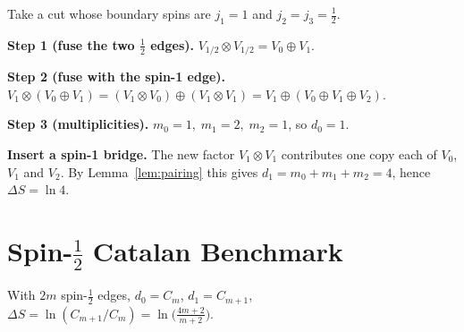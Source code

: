 \documentclass[11pt]{article}
\begin{document}
\begin{example}\label{ex:mixed}
  Take a cut whose boundary spins are \(j_1=1\) and \(j_2=j_3=\tfrac12\).

  \textbf{Step 1 (fuse the two \(\tfrac12\) edges).} \(V_{1/2}\otimes V_{1/2}=V_0\oplus V_1\).

  \textbf{Step 2 (fuse with the spin-1 edge).} \(V_1\otimes(V_0\oplus V_1)=(V_1\otimes V_0)\oplus(V_1\otimes V_1)=V_1\oplus(V_0\oplus V_1\oplus V_2)\).

  \textbf{Step 3 (multiplicities).} \(m_0=1,\; m_1=2,\; m_2=1\), so \(d_0=1\).

  \textbf{Insert a spin-1 bridge.}
  The new factor \(V_1\otimes V_1\) contributes one copy each of
  \(V_0\), \(V_1\) and \(V_2\).
  By Lemma~\ref{lem:pairing} this gives
  \(d_1=m_0+m_1+m_2=4\), hence \(\Delta S=\ln 4\).


\end{example}


\section{Spin-$\tfrac12$ Catalan Benchmark}\label{sec:catalan}

\begin{corollary} With $2m$ spin-$\tfrac12$ edges, $d_0=C_m$, $d_1=C_{m+1}$, $\Delta S=\ln(C_{m+1}/C_m)=\ln\bigl(\tfrac{4m+2}{m+2}\bigr)$.
\end{corollary}
\end{document}
